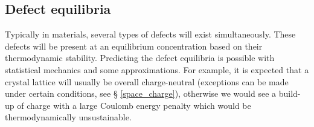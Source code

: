 \subsection{Defect equilibria} \label{brouwer_method} %

Typically in materials, several types of defects will exist simultaneously. These defects will be present at an equilibrium concentration based on their thermodynamic stability. Predicting the defect equilibria is possible with statistical mechanics and some approximations. For example, it is expected that a crystal lattice will usually be overall charge-neutral (exceptions can be made under certain conditions, see § \ref{space_charge}), otherwise we would see a build-up of charge with a large Coulomb energy penalty which would be thermodynamically unsustainable.

